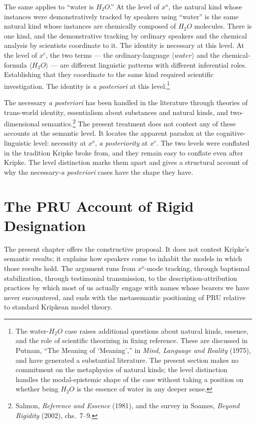 \documentclass[12pt,a4paper]{article}
\begin{document}
The same applies to ``water is \(H_2O\).'' At the level of \(x^o\), the natural kind whose instances were demonstratively tracked by speakers using ``water'' is the same natural kind whose instances are chemically composed of \(H_2O\) molecules. There is one kind, and the demonstrative tracking by ordinary speakers and the chemical analysis by scientists coordinate to it. The identity is necessary at this level. At the level of \(x^c\), the two terms --- the ordinary-language \(\langle water \rangle\) and the chemical-formula \(\langle H_2O \rangle\) --- are different linguistic patterns with different inferential roles. Establishing that they coordinate to the same kind required scientific investigation. The identity is \emph{a posteriori} at this level.\footnote{The water-\(H_2O\) case raises additional questions about natural kinds, essence, and the role of scientific theorizing in fixing reference. These are discussed in Putnam, ``The Meaning of `Meaning','' in \emph{Mind, Language and Reality} (1975), and have generated a substantial literature. The present section makes no commitment on the metaphysics of natural kinds; the level distinction handles the modal-epistemic shape of the case without taking a position on whether being \(H_2O\) is the essence of water in any deeper sense.}

The necessary \emph{a posteriori} has been handled in the literature through theories of trans-world identity, essentialism about substances and natural kinds, and two-dimensional semantics.\footnote{Salmon, \emph{Reference and Essence} (1981), and the survey in Soames, \emph{Beyond Rigidity} (2002), chs.~7--9.} The present treatment does not contest any of these accounts at the semantic level. It locates the apparent paradox at the cognitive-linguistic level: necessity at \(x^o\), \emph{a posteriority} at \(x^c\). The two levels were conflated in the tradition Kripke broke from, and they remain easy to conflate even after Kripke. The level distinction marks them apart and gives a structural account of why the necessary-\emph{a posteriori} cases have the shape they have.

\section{The PRU Account of Rigid Designation}\label{the-pru-account-of-rigid-designation}

The present chapter offers the constructive proposal. It does not contest Kripke's semantic results; it explains how speakers come to inhabit the models in which those results hold. The argument runs from \(x^o\)-mode tracking, through baptismal stabilization, through testimonial transmission, to the description-attribution practices by which most of us actually engage with names whose bearers we have never encountered, and ends with the metasemantic positioning of PRU relative to standard Kripkean model theory.
\end{document}
